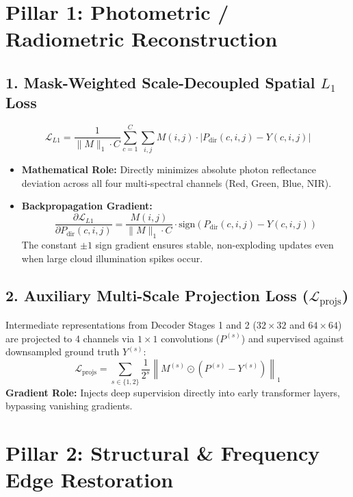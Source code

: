 \documentclass[11pt,a4paper]{article}
\begin{document}
\newpage

\section{Pillar 1: Photometric / Radiometric Reconstruction}

\subsection{1. Mask-Weighted Scale-Decoupled Spatial $L_1$ Loss}
\begin{equation}
\mathcal{L}_{L1} = \frac{1}{\|M\|_1 \cdot C} \sum_{c=1}^C \sum_{i, j} M(i, j) \cdot \left| P_{\text{dir}}(c, i, j) - Y(c, i, j) \right|
\end{equation}
\begin{itemize}[leftmargin=1.5em, itemsep=0.2em]
    \item \textbf{Mathematical Role:} Directly minimizes absolute photon reflectance deviation across all four multi-spectral channels (Red, Green, Blue, NIR).
    \item \textbf{Backpropagation Gradient:}
    \begin{equation}
    \frac{\partial \mathcal{L}_{L1}}{\partial P_{\text{dir}}(c, i, j)} = \frac{M(i, j)}{\|M\|_1 \cdot C} \cdot \text{sign}\left( P_{\text{dir}}(c, i, j) - Y(c, i, j) \right)
    \end{equation}
    The constant $\pm 1$ sign gradient ensures stable, non-exploding updates even when large cloud illumination spikes occur.
\end{itemize}

\subsection{2. Auxiliary Multi-Scale Projection Loss ($\mathcal{L}_{\text{projs}}$)}
Intermediate representations from Decoder Stages 1 and 2 ($32 \times 32$ and $64 \times 64$) are projected to 4 channels via $1 \times 1$ convolutions ($P^{(s)}$) and supervised against downsampled ground truth $Y^{(s)}$:
\begin{equation}
\mathcal{L}_{\text{projs}} = \sum_{s \in \{1, 2\}} \frac{1}{2^s} \left\| M^{(s)} \odot \left( P^{(s)} - Y^{(s)} \right) \right\|_1
\end{equation}
\textbf{Gradient Role:} Injects deep supervision directly into early transformer layers, bypassing vanishing gradients.

\section{Pillar 2: Structural \& Frequency Edge Restoration}
\end{document}
